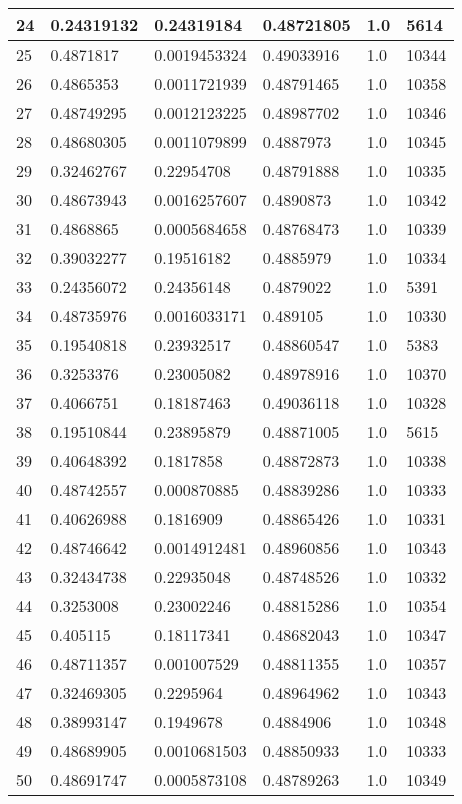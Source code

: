 \begin{longtable}{|l|l|l|l|l|l|}
24 & 0.24319132 & 0.24319184 & 0.48721805 & 1.0 & 5614 \\ \hline 
25 & 0.4871817 & 0.0019453324 & 0.49033916 & 1.0 & 10344 \\ \hline 
26 & 0.4865353 & 0.0011721939 & 0.48791465 & 1.0 & 10358 \\ \hline 
27 & 0.48749295 & 0.0012123225 & 0.48987702 & 1.0 & 10346 \\ \hline 
28 & 0.48680305 & 0.0011079899 & 0.4887973 & 1.0 & 10345 \\ \hline 
29 & 0.32462767 & 0.22954708 & 0.48791888 & 1.0 & 10335 \\ \hline 
30 & 0.48673943 & 0.0016257607 & 0.4890873 & 1.0 & 10342 \\ \hline 
31 & 0.4868865 & 0.0005684658 & 0.48768473 & 1.0 & 10339 \\ \hline 
32 & 0.39032277 & 0.19516182 & 0.4885979 & 1.0 & 10334 \\ \hline 
33 & 0.24356072 & 0.24356148 & 0.4879022 & 1.0 & 5391 \\ \hline 
34 & 0.48735976 & 0.0016033171 & 0.489105 & 1.0 & 10330 \\ \hline 
35 & 0.19540818 & 0.23932517 & 0.48860547 & 1.0 & 5383 \\ \hline 
36 & 0.3253376 & 0.23005082 & 0.48978916 & 1.0 & 10370 \\ \hline 
37 & 0.4066751 & 0.18187463 & 0.49036118 & 1.0 & 10328 \\ \hline 
38 & 0.19510844 & 0.23895879 & 0.48871005 & 1.0 & 5615 \\ \hline 
39 & 0.40648392 & 0.1817858 & 0.48872873 & 1.0 & 10338 \\ \hline 
40 & 0.48742557 & 0.000870885 & 0.48839286 & 1.0 & 10333 \\ \hline 
41 & 0.40626988 & 0.1816909 & 0.48865426 & 1.0 & 10331 \\ \hline 
42 & 0.48746642 & 0.0014912481 & 0.48960856 & 1.0 & 10343 \\ \hline 
43 & 0.32434738 & 0.22935048 & 0.48748526 & 1.0 & 10332 \\ \hline 
44 & 0.3253008 & 0.23002246 & 0.48815286 & 1.0 & 10354 \\ \hline 
45 & 0.405115 & 0.18117341 & 0.48682043 & 1.0 & 10347 \\ \hline 
46 & 0.48711357 & 0.001007529 & 0.48811355 & 1.0 & 10357 \\ \hline 
47 & 0.32469305 & 0.2295964 & 0.48964962 & 1.0 & 10343 \\ \hline 
48 & 0.38993147 & 0.1949678 & 0.4884906 & 1.0 & 10348 \\ \hline 
49 & 0.48689905 & 0.0010681503 & 0.48850933 & 1.0 & 10333 \\ \hline 
50 & 0.48691747 & 0.0005873108 & 0.48789263 & 1.0 & 10349 \\ \hline 
\end{longtable}